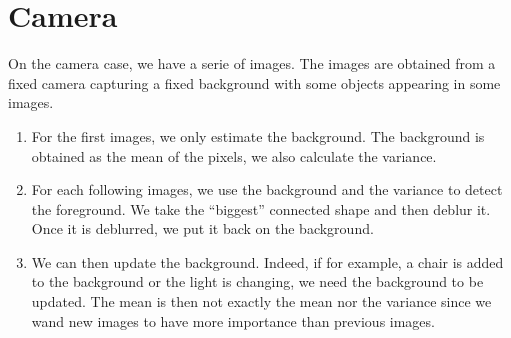 \section{Camera}
On the camera case, we have a serie of images.
The images are obtained from a fixed camera capturing a fixed
background with some objects appearing in some images.
\begin{enumerate}
  \item For the first images, we only estimate the background.
    The background is obtained as the mean of the pixels,
    we also calculate the variance.
  \item For each following images, we use the background and the variance
    to detect the foreground.
    We take the ``biggest'' connected shape and then deblur it.
    Once it is deblurred, we put it back on the background.
  \item We can then update the background.
    Indeed, if for example, a chair is added to the background
    or the light is changing, we need the background to be updated.
    The mean is then not exactly the mean nor the variance
    since we wand new images to have more importance than previous
    images.
\end{enumerate}
